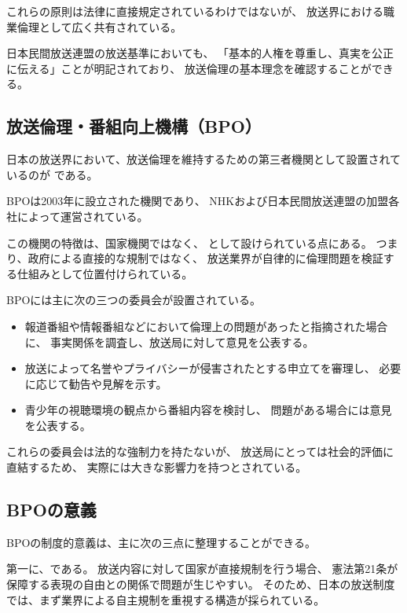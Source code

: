 これらの原則は法律に直接規定されているわけではないが、
放送界における職業倫理として広く共有されている。

日本民間放送連盟の放送基準においても、
「基本的人権を尊重し、真実を公正に伝える」ことが明記されており、
放送倫理の基本理念を確認することができる。

\subsection{放送倫理・番組向上機構（BPO）}

日本の放送界において、放送倫理を維持するための第三者機関として設置されているのが
である。

BPOは2003年に設立された機関であり、
NHKおよび日本民間放送連盟の加盟各社によって運営されている。

この機関の特徴は、国家機関ではなく、
として設けられている点にある。
つまり、政府による直接的な規制ではなく、
放送業界が自律的に倫理問題を検証する仕組みとして位置付けられている。

BPOには主に次の三つの委員会が設置されている。

\begin{itemize}
  \item {}  
  報道番組や情報番組などにおいて倫理上の問題があったと指摘された場合に、
  事実関係を調査し、放送局に対して意見を公表する。

  \item {}  
  放送によって名誉やプライバシーが侵害されたとする申立てを審理し、
  必要に応じて勧告や見解を示す。

  \item {}  
  青少年の視聴環境の観点から番組内容を検討し、
  問題がある場合には意見を公表する。
\end{itemize}

これらの委員会は法的な強制力を持たないが、
放送局にとっては社会的評価に直結するため、
実際には大きな影響力を持つとされている。

\subsection{BPOの意義}

BPOの制度的意義は、主に次の三点に整理することができる。

第一に、である。
放送内容に対して国家が直接規制を行う場合、
憲法第21条が保障する表現の自由との関係で問題が生じやすい。
そのため、日本の放送制度では、まず業界による自主規制を重視する構造が採られている。


